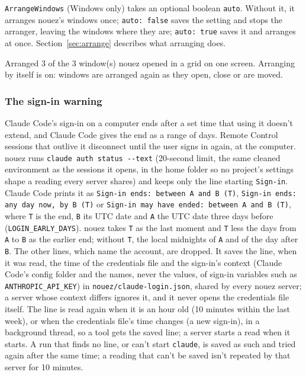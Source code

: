 \documentclass[10pt,a4paper]{article}
\newcommand{\code}[1]{\texttt{#1}}
\begin{document}
\code{ArrangeWindows} (Windows only) takes an optional boolean \code{auto}. Without it, it arranges
nouez's windows once; \code{auto: false} saves the setting and stops the arranger, leaving the
windows where they are; \code{auto: true} saves it and arranges at once. Section~\ref{sec:arrange}
describes what arranging does.
\begin{plain}
Arranged 3 of the 3 window(s) nouez opened in a grid on one screen. Arranging by itself is on: windows are arranged again as they open, close or are moved.
\end{plain}

\subsubsection*{The sign-in warning}

Claude Code's sign-in on a computer ends after a set time that using it doesn't extend, and
Claude Code gives the end as a range of days. Remote Control sessions that outlive it disconnect
until the user signs in again, at the computer. nouez runs \code{claude auth status -{}-text}
(20-second limit, the same cleaned environment as the sessions it opens, in the home folder so no
project's settings shape a reading every server shares) and keeps only the line
starting \code{Sign-in}. Claude Code prints it as \code{Sign-in ends: between A and B (T)},
\code{Sign-in ends: any day now, by B (T)} or \code{Sign-in may have ended: between A and B (T)},
where \code{T} is the end, \code{B} its UTC date and \code{A} the UTC date three days before
(\code{LOGIN\_EARLY\_DAYS}). nouez takes \code{T} as the last moment and \code{T} less the days
from \code{A} to \code{B} as the earlier end; without \code{T}, the local midnights of \code{A} and of
the day after \code{B}. The other lines, which name the account, are dropped. It saves the line, when
it was read, the time of the credentials file and the sign-in's context (Claude Code's config folder
and the names, never the values, of sign-in variables such as \code{ANTHROPIC\_API\_KEY}) in
\code{nouez/claude-login.json}, shared by every nouez server; a server whose context differs ignores
it, and it never opens the credentials file itself. The line is read again when it is an hour old
(10 minutes within the last week), or when the credentials file's time changes (a new sign-in), in a
background thread, so a tool gets the saved line; a server starts a read when it starts. A run that
finds no line, or can't start \code{claude}, is saved as such and tried again after the same time; a
reading that can't be saved isn't repeated by that server for 10 minutes.
\end{document}
